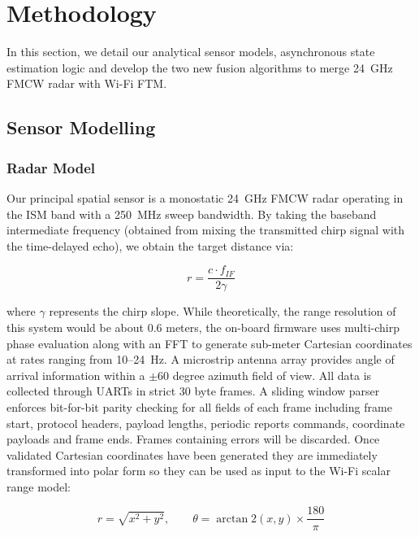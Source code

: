 \chapter{Methodology}
\label{chap:methodology}

In this section, we detail our analytical sensor models, asynchronous state estimation logic and develop the two new fusion algorithms to merge 24~GHz FMCW radar with Wi-Fi FTM.

\section{Sensor Modelling}
\label{sec:sensormodel}

\subsection{Radar Model}
\label{sec:radarmodel}

Our principal spatial sensor is a monostatic 24~GHz FMCW radar operating in the ISM band with a 250~MHz sweep bandwidth. By taking the baseband intermediate frequency (obtained from mixing the transmitted chirp signal with the time-delayed echo), we obtain the target distance via:

\begin{equation}
r = \frac{c \cdot f_{IF}}{2\gamma}
\label{eq:radar_range}
\end{equation}

where $\gamma$ represents the chirp slope. While theoretically, the range resolution of this system would be about 0.6 meters, the on-board firmware uses multi-chirp phase evaluation along with an FFT to generate sub-meter Cartesian coordinates at rates ranging from 10--24~Hz. A microstrip antenna array provides angle of arrival information within a $\pm$60 degree azimuth field of view. All data is collected through UARTs in strict 30 byte frames. A sliding window parser enforces bit-for-bit parity checking for all fields of each frame including frame start, protocol headers, payload lengths, periodic reports commands, coordinate payloads and frame ends. Frames containing errors will be discarded. Once validated Cartesian coordinates have been generated they are immediately transformed into polar form so they can be used as input to the Wi-Fi scalar range model:

\begin{equation}
r = \sqrt{x^2 + y^2}, \qquad \theta = \arctan2(x, y) \times \frac{180}{\pi}
\label{eq:polar_transform}
\end{equation}

